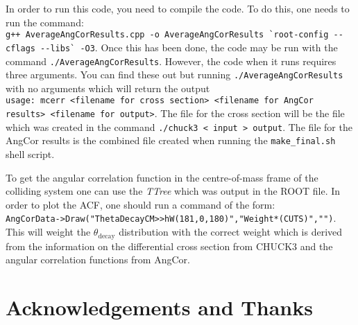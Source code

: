 \documentclass[a4paper,10pt]{article}
\begin{document}
In order to run this code, you need to compile the code. To do this, one needs to run the command:\\
\lstinline!g++ AverageAngCorResults.cpp -o AverageAngCorResults `root-config --cflags --libs` -O3!. Once this has been done, the code may be run with the command \lstinline!./AverageAngCorResults!. However, the code when it runs requires three arguments. You can find these out but running \lstinline!./AverageAngCorResults! with no arguments which will return the output\\ \lstinline!usage: mcerr <filename for cross section> <filename for AngCor results> <filename for output>!. The file for the cross section will be the file which was created in the command \lstinline!./chuck3 < input > output!. The file for the AngCor results is the combined file created when running the \lstinline!make_final.sh! shell script.
 
To get the angular correlation function in the centre-of-mass frame of the colliding system one can use the {\it TTree} which was output in the ROOT file. In order to plot the ACF, one should run a command of the form:\\ \lstinline!AngCorData->Draw("ThetaDecayCM>>hW(181,0,180)","Weight*(CUTS)","")!. This will weight the $\theta_{\mathrm{decay}}$ distribution with the correct weight which is derived from the information on the differential cross section from CHUCK3 and the angular correlation functions from AngCor.

\section{Acknowledgements and Thanks}
\end{document}
